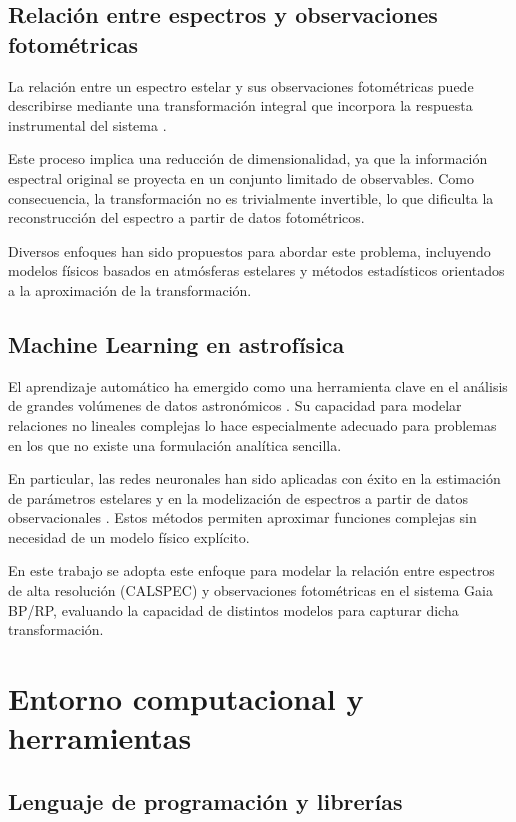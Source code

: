 \documentclass{article}
\begin{document}
\subsection{Relación entre espectros y observaciones fotométricas}

La relación entre un espectro estelar y sus observaciones fotométricas puede describirse mediante una transformación integral que incorpora la respuesta instrumental del sistema \cite{bessell2012}.

Este proceso implica una reducción de dimensionalidad, ya que la información espectral original se proyecta en un conjunto limitado de observables. Como consecuencia, la transformación no es trivialmente invertible, lo que dificulta la reconstrucción del espectro a partir de datos fotométricos.

Diversos enfoques han sido propuestos para abordar este problema, incluyendo modelos físicos basados en atmósferas estelares y métodos estadísticos orientados a la aproximación de la transformación.

\subsection{Machine Learning en astrofísica}

El aprendizaje automático ha emergido como una herramienta clave en el análisis de grandes volúmenes de datos astronómicos \cite{baron2019}. Su capacidad para modelar relaciones no lineales complejas lo hace especialmente adecuado para problemas en los que no existe una formulación analítica sencilla.

En particular, las redes neuronales han sido aplicadas con éxito en la estimación de parámetros estelares y en la modelización de espectros a partir de datos observacionales \cite{ting2019}. Estos métodos permiten aproximar funciones complejas sin necesidad de un modelo físico explícito.

En este trabajo se adopta este enfoque para modelar la relación entre espectros de alta resolución (CALSPEC) y observaciones fotométricas en el sistema Gaia BP/RP, evaluando la capacidad de distintos modelos para capturar dicha transformación.




\newpage
\section{Entorno computacional y herramientas}

\subsection{Lenguaje de programación y librerías}
\end{document}
